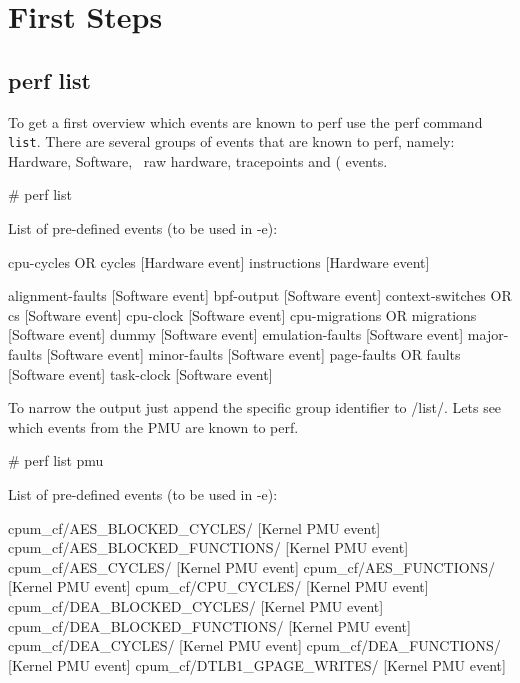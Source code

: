 \chapter{First Steps}
\section{perf list}

To get a first overview which events are known to perf use the perf
command {\tt list}. There are several groups of events that are known to
perf, namely: Hardware, Software, \PMU\, raw hardware,
tracepoints and  (\SDT\) events.

\starttyping
# perf list

List of pre-defined events (to be used in -e):

  cpu-cycles OR cycles                               [Hardware event]
  instructions                                       [Hardware event]

  alignment-faults                                   [Software event]
  bpf-output                                         [Software event]
  context-switches OR cs                             [Software event]
  cpu-clock                                          [Software event]
  cpu-migrations OR migrations                       [Software event]
  dummy                                              [Software event]
  emulation-faults                                   [Software event]
  major-faults                                       [Software event]
  minor-faults                                       [Software event]
  page-faults OR faults                              [Software event]
  task-clock                                         [Software event]
\stoptyping

To narrow the output just append the specific group identifier to
/list/. Lets see which events from the PMU are known to perf.

\starttyping
# perf list pmu

List of pre-defined events (to be used in -e):

  cpum_cf/AES_BLOCKED_CYCLES/                        [Kernel PMU event]
  cpum_cf/AES_BLOCKED_FUNCTIONS/                     [Kernel PMU event]
  cpum_cf/AES_CYCLES/                                [Kernel PMU event]
  cpum_cf/AES_FUNCTIONS/                             [Kernel PMU event]
  cpum_cf/CPU_CYCLES/                                [Kernel PMU event]
  cpum_cf/DEA_BLOCKED_CYCLES/                        [Kernel PMU event]
  cpum_cf/DEA_BLOCKED_FUNCTIONS/                     [Kernel PMU event]
  cpum_cf/DEA_CYCLES/                                [Kernel PMU event]
  cpum_cf/DEA_FUNCTIONS/                             [Kernel PMU event]
  cpum_cf/DTLB1_GPAGE_WRITES/                        [Kernel PMU event]
\stoptyping

